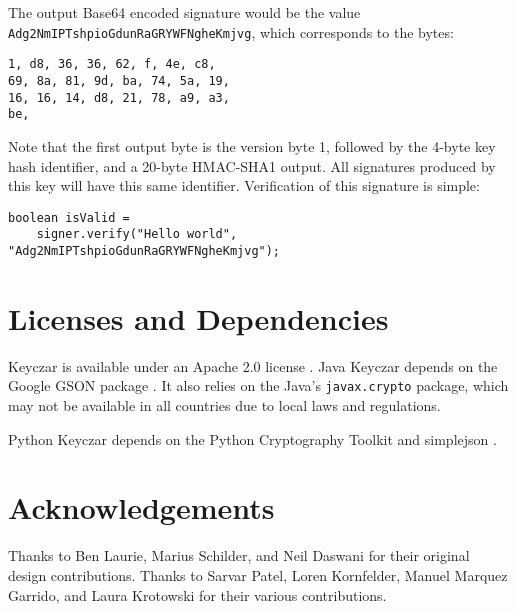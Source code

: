 \documentclass{llncs}
\begin{document}
The output Base64 encoded signature would be the value {\tt
Adg2NmIPTshpioGdunRaGRYWFNgheKmjvg}, which corresponds to the bytes:
\begin{verbatim}
1, d8, 36, 36, 62, f, 4e, c8,
69, 8a, 81, 9d, ba, 74, 5a, 19,
16, 16, 14, d8, 21, 78, a9, a3,
be,
\end{verbatim}

Note that the first output byte is the version byte 1, followed by the 4-byte
key hash identifier, and a 20-byte HMAC-SHA1 output. All signatures produced by
this key will have this same identifier. Verification of this signature is
simple:
\begin{verbatim}
boolean isValid =
    signer.verify("Hello world", "Adg2NmIPTshpioGdunRaGRYWFNgheKmjvg");
\end{verbatim}

\section{Licenses and Dependencies}

Keyczar is available under an Apache 2.0 license \cite{apache2}. Java Keyczar
depends on the Google GSON package \cite{google-gson}. It also relies on the
Java's {\tt javax.crypto} package, which may not be available in all countries
due to local laws and regulations.

Python Keyczar depends on the Python Cryptography Toolkit \cite{python-crypto}
and simplejson \cite{simplejson}. 

\section{Acknowledgements}

Thanks to Ben Laurie, Marius Schilder, and Neil Daswani for their original
design contributions. Thanks to Sarvar Patel, Loren Kornfelder, Manuel Marquez
Garrido, and Laura Krotowski for their various contributions.



\end{document}
